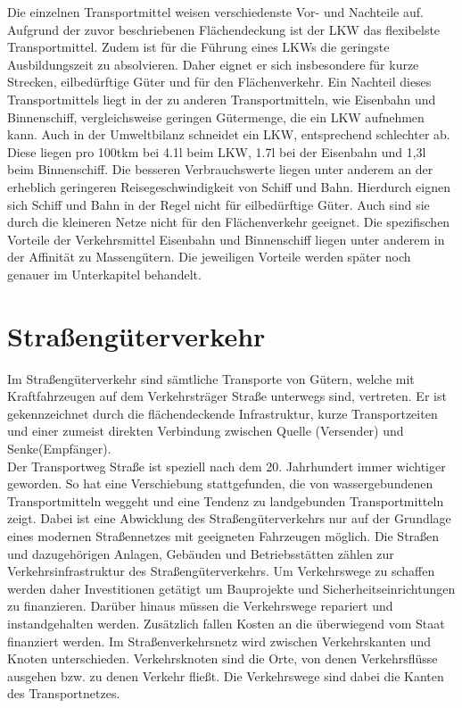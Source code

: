 \documentclass[a4paper,12pt]{scrreprt}
\begin{document}
	Die einzelnen Transportmittel weisen verschiedenste Vor- und Nachteile auf. Aufgrund der zuvor beschriebenen Flächendeckung ist der LKW das flexibelste Transportmittel. Zudem ist für die Führung eines LKWs die geringste Ausbildungszeit zu absolvieren. Daher eignet er sich insbesondere für kurze Strecken, eilbedürftige Güter und für den Flächenverkehr. Ein Nachteil dieses Transportmittels liegt in der zu anderen Transportmitteln, wie Eisenbahn und Binnenschiff, vergleichsweise  geringen Gütermenge, die ein LKW aufnehmen kann. Auch in der Umweltbilanz schneidet ein LKW, entsprechend schlechter ab. Diese liegen pro 100tkm bei 4.1l beim LKW, 1.7l bei der Eisenbahn und 1,3l beim Binnenschiff. Die besseren Verbrauchswerte liegen unter anderem an der erheblich geringeren Reisegeschwindigkeit von Schiff und Bahn. Hierdurch eignen sich Schiff und Bahn in der Regel nicht für eilbedürftige Güter. Auch sind sie durch die kleineren Netze nicht für den Flächenverkehr geeignet. Die spezifischen Vorteile der Verkehrsmittel Eisenbahn und Binnenschiff liegen unter anderem in der Affinität zu Massengütern. Die jeweiligen Vorteile werden später noch genauer im Unterkapitel behandelt.
	\section{Straßengüterverkehr}
	Im Straßengüterverkehr sind sämtliche Transporte von Gütern, welche mit Kraftfahrzeugen auf dem Verkehrsträger Straße unterwegs sind, vertreten. Er ist gekennzeichnet durch die flächendeckende Infrastruktur, kurze Transportzeiten und einer zumeist direkten Verbindung zwischen Quelle (Versender) und Senke(Empfänger).\\
	
	Der Transportweg Straße ist speziell nach dem 20. Jahrhundert immer wichtiger geworden. So hat eine Verschiebung stattgefunden, die von wassergebundenen Transportmitteln weggeht und eine Tendenz zu landgebunden Transportmitteln zeigt. Dabei ist eine Abwicklung des Straßengüterverkehrs nur auf der Grundlage eines modernen Straßennetzes mit geeigneten Fahrzeugen möglich. Die Straßen und dazugehörigen Anlagen, Gebäuden und Betriebsstätten zählen zur Verkehrsinfrastruktur des Straßengüterverkehrs. Um Verkehrswege zu schaffen werden daher Investitionen getätigt um Bauprojekte und Sicherheitseinrichtungen zu finanzieren. Darüber hinaus müssen die Verkehrswege repariert und instandgehalten werden. Zusätzlich fallen Kosten an die überwiegend vom Staat finanziert werden. Im Straßenverkehrsnetz wird zwischen Verkehrskanten und Knoten unterschieden. Verkehrsknoten sind die Orte, von denen Verkehrsflüsse ausgehen bzw. zu denen Verkehr fließt. Die Verkehrswege sind dabei die Kanten des Transportnetzes.\\
	
\end{document}
